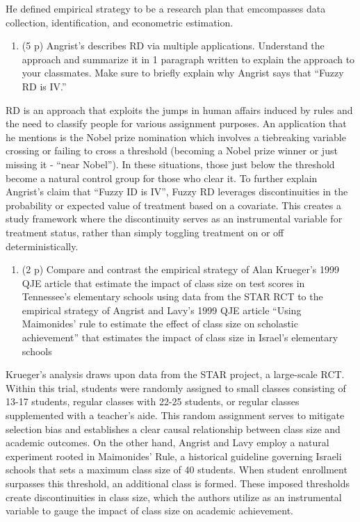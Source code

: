 \documentclass[
]{article}
\providecommand{\tightlist}{%
  \setlength{\itemsep}{0pt}\setlength{\parskip}{0pt}}
\begin{document}
He defined empirical strategy to be a research plan that emcompasses
data collection, identification, and econometric estimation.

\begin{enumerate}
\def\labelenumi{\arabic{enumi}.}
\setcounter{enumi}{18}
\tightlist
\item
  (5 p) Angrist's describes RD via multiple applications. Understand the
  approach and summarize it in 1 paragraph written to explain the
  approach to your classmates. Make sure to briefly explain why Angrist
  says that ``Fuzzy RD is IV.''
\end{enumerate}

RD is an approach that exploits the jumps in human affairs induced by
rules and the need to classify people for various assignment purposes.
An application that he mentions is the Nobel prize nomination which
involves a tiebreaking variable crossing or failing to cross a threshold
(becoming a Nobel prize winner or just missing it - ``near Nobel''). In
these situations, those just below the threshold become a natural
control group for those who clear it. To further explain Angrist's claim
that ``Fuzzy ID is IV'', Fuzzy RD leverages discontinuities in the
probability or expected value of treatment based on a covariate. This
creates a study framework where the discontinuity serves as an
instrumental variable for treatment status, rather than simply toggling
treatment on or off deterministically.

\begin{enumerate}
\def\labelenumi{\arabic{enumi}.}
\setcounter{enumi}{19}
\tightlist
\item
  (2 p) Compare and contrast the empirical strategy of Alan Krueger's
  1999 QJE article that estimate the impact of class size on test scores
  in Tennessee's elementary schools using data from the STAR RCT to the
  empirical strategy of Angrist and Lavy's 1999 QJE article ``Using
  Maimonides' rule to estimate the effect of class size on scholastic
  achievement'' that estimates the impact of class size in Israel's
  elementary schools
\end{enumerate}

Krueger's analysis draws upon data from the STAR project, a large-scale
RCT. Within this trial, students were randomly assigned to small classes
consisting of 13-17 students, regular classes with 22-25 students, or
regular classes supplemented with a teacher's aide. This random
assignment serves to mitigate selection bias and establishes a clear
causal relationship between class size and academic outcomes. On the
other hand, Angrist and Lavy employ a natural experiment rooted in
Maimonides' Rule, a historical guideline governing Israeli schools that
sets a maximum class size of 40 students. When student enrollment
surpasses this threshold, an additional class is formed. These imposed
thresholds create discontinuities in class size, which the authors
utilize as an instrumental variable to gauge the impact of class size on
academic achievement.
\end{document}
